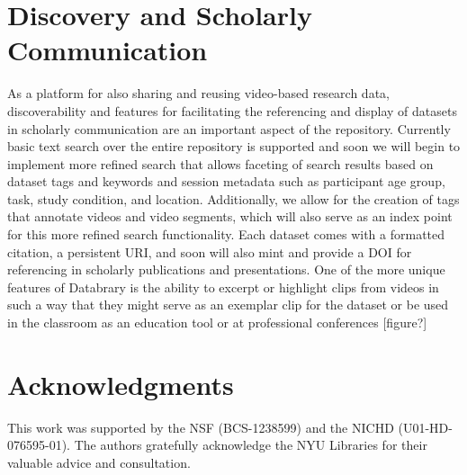\documentclass{sig-alternate}
\begin{document}
\section{Discovery and Scholarly Communication}

As a platform for also sharing and reusing video-based research data, discoverability and features for facilitating the referencing and display of datasets in scholarly communication are an important aspect of the repository. 
Currently basic text search over the entire repository is supported and soon we will begin to implement more refined search that allows faceting of search results based on dataset tags and keywords and session metadata such as participant age group, task, study condition, and location.
Additionally, we allow for the creation of tags that annotate videos and video segments, which will also serve as an index point for this more refined search functionality.  
Each dataset comes with a formatted citation, a persistent URI, and soon will also mint and provide a DOI for referencing in scholarly publications and presentations.
One of the more unique features of Databrary is the ability to excerpt or highlight clips from videos in such a way that they might serve as an exemplar clip for the dataset or be used in the classroom as an education tool or at professional conferences [figure?]

\section*{Acknowledgments}

This work was supported by the NSF (BCS-1238599) and the NICHD (U01-HD-076595-01).
The authors gratefully acknowledge the NYU Libraries for their valuable advice and consultation.



\end{document}

